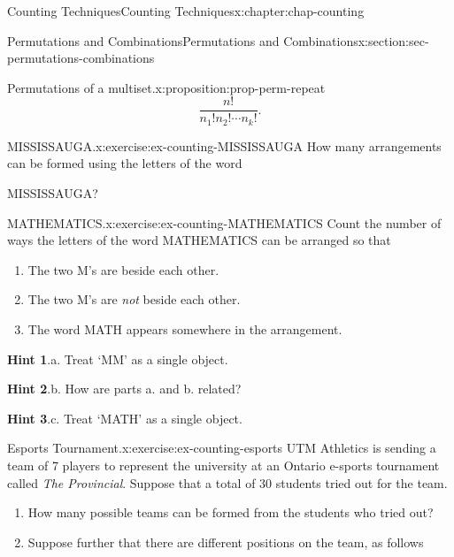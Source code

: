\documentclass[oneside,10pt,]{book}
\newcommand{\blocktitlefont}{\relax}
\numberwithin{equation}{section}
\begin{document}
\begin{chapterptx}{Counting Techniques}{}{Counting Techniques}{}{}{x:chapter:chap-counting}
\begin{sectionptx}{Permutations and Combinations}{}{Permutations and Combinations}{}{}{x:section:sec-permutations-combinations}
\begin{proposition}{Permutations of a multiset.}{}{x:proposition:prop-perm-repeat}
\begin{equation*}
\dfrac{n!}{n_1! n_2! \cdots n_k!}\text{.}
\end{equation*}
%
\end{proposition}
\begin{inlineexercise}{MISSISSAUGA.}{x:exercise:ex-counting-MISSISSAUGA}%
How many arrangements can be formed using the letters of the word%
\begin{sidebyside}{1}{0.375}{0.375}{0}%
\begin{sbspanel}{0.25}%
MISSISSAUGA?%
\end{sbspanel}%
\end{sidebyside}%
\end{inlineexercise}
\begin{inlineexercise}{MATHEMATICS.}{x:exercise:ex-counting-MATHEMATICS}%
Count the number of ways the letters of the word MATHEMATICS can be arranged so that%
\begin{enumerate}[label=(\alph*)]
\item{}The two M's are beside each other.%
\item{}The two M's are \emph{not} beside each other.%
\item{}The word MATH appears somewhere in the arrangement.%
\end{enumerate}
%
\par\smallskip%
\noindent\textbf{\blocktitlefont Hint 1}.\hypertarget{g:hint:id472668}{}\quad{}a. Treat `MM' as a single object.%
\par\smallskip%
\noindent\textbf{\blocktitlefont Hint 2}.\hypertarget{g:hint:id472685}{}\quad{}b. How are parts a. and b. related?%
\par\smallskip%
\noindent\textbf{\blocktitlefont Hint 3}.\hypertarget{g:hint:id472683}{}\quad{}c. Treat `MATH' as a single object.%
\end{inlineexercise}
\begin{inlineexercise}{Esports Tournament.}{x:exercise:ex-counting-esports}%
UTM Athletics is sending a team of 7 players to represent the university at an Ontario e-sports tournament called \emph{The Provincial}. Suppose that a total of 30 students tried out for the team.%
\begin{enumerate}[label=(\alph*)]
\item{}How many possible teams can be formed from the students who tried out?%
\item{}Suppose further that there are different positions on the team, as follows%
\begin{itemize}[label=\textbullet]

\end{itemize}
\end{enumerate}
\end{inlineexercise}
\end{sectionptx}
\end{chapterptx}
\end{document}
